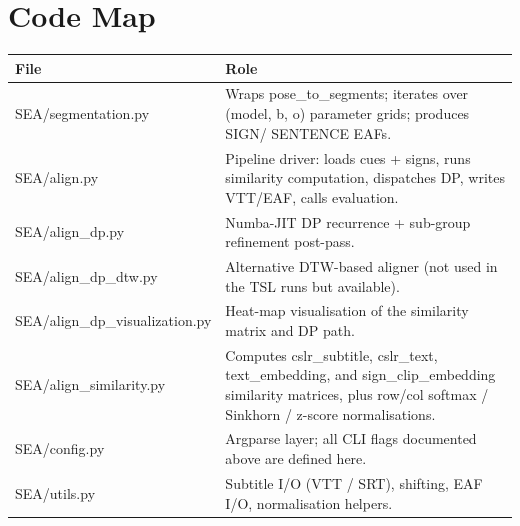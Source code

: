 \documentclass[11pt,a4paper]{article}
\def\texttt#1{#1}%
\def\textbf#1{#1}%
\begin{document}
\section{Code Map}

\begin{table}[h]
\centering
\small
\begin{tabularx}{\linewidth}{lX}
\toprule
\textbf{File} & \textbf{Role} \\
\midrule
\texttt{SEA/segmentation.py}        & Wraps \texttt{pose\_to\_segments};
                                       iterates over (model, b, o) parameter
                                       grids; produces \texttt{SIGN}/
                                       \texttt{SENTENCE} EAFs. \\
\texttt{SEA/align.py}               & Pipeline driver: loads cues + signs,
                                       runs similarity computation,
                                       dispatches DP, writes VTT/EAF, calls
                                       evaluation. \\
\texttt{SEA/align\_dp.py}           & Numba-JIT DP recurrence + sub-group
                                       refinement post-pass. \\
\texttt{SEA/align\_dp\_dtw.py}      & Alternative DTW-based aligner (not used
                                       in the TSL runs but available). \\
\texttt{SEA/align\_dp\_visualization.py} & Heat-map visualisation of the
                                       similarity matrix and DP path. \\
\texttt{SEA/align\_similarity.py}   & Computes \texttt{cslr\_subtitle},
                                       \texttt{cslr\_text},
                                       \texttt{text\_embedding}, and
                                       \texttt{sign\_clip\_embedding}
                                       similarity matrices, plus row/col
                                       softmax / Sinkhorn / z-score
                                       normalisations. \\
\texttt{SEA/config.py}              & Argparse layer; all CLI flags
                                       documented above are defined here. \\
\texttt{SEA/utils.py}               & Subtitle I/O (VTT / SRT), shifting,
                                       EAF I/O, normalisation helpers. \\

\end{tabularx}
\end{table}
\end{document}
